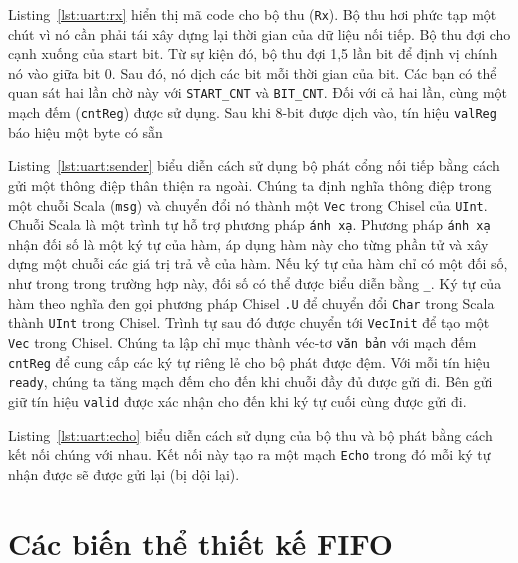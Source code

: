\documentclass[%
    10pt,
    headinclude, footexclude,
    openright, %
    notitlepage,
    cleardoubleempty,
    headsepline,
    pointlessnumbers,
    bibtotoc, idxtotoc,
    ]{scrbook}
\newcommand{\code}[1]{{\small{\texttt{#1}}}}
\begin{document}

Listing~\ref{lst:uart:rx} hiển thị mã code cho bộ thu (\code{Rx}). Bộ thu hơi phức tạp một chút vì nó cần phải tái xây dựng lại thời gian của dữ liệu nối tiếp. Bộ thu đợi cho cạnh xuống của start bit. Từ sự kiện đó, bộ thu đợi 1,5 lần bit để định vị chính nó vào giữa bit 0. Sau đó, nó dịch các bit mỗi thời gian của bit. Các bạn có thể quan sát hai lần chờ này với \code {START\_CNT} và \code{BIT\_CNT}. Đối với cả hai lần, cùng một mạch đếm (\code{cntReg}) được sử dụng. Sau khi 8-bit được dịch vào, tín hiệu \code{valReg} báo hiệu một byte có sẵn 


Listing~\ref{lst:uart:sender} biểu diễn cách sử dụng bộ phát cổng nối tiếp bằng cách gửi một thông điệp thân thiện ra ngoài. Chúng ta định nghĩa thông điệp trong một chuỗi Scala (\code{msg}) và chuyển đổi nó thành một \code{Vec} trong Chisel của \code{UInt}. Chuỗi Scala là một trình tự hỗ trợ phương pháp \code{ánh xạ}. Phương pháp \code{ánh xạ} nhận đối số là một ký tự của hàm, áp dụng hàm này cho từng phần tử và xây dựng một chuỗi các giá trị trả về của hàm. Nếu ký tự của hàm chỉ có một đối số, như trong trong trường hợp này, đối số có thể được biểu diễn bằng \code{\_}. Ký tự của hàm theo nghĩa đen gọi phương pháp Chisel \code{.U} để chuyển đổi \code{Char} trong Scala thành \code{UInt} trong Chisel. Trình tự sau đó được chuyển tới \code{VecInit} để tạo một \code{Vec} trong Chisel. Chúng ta lập chỉ mục thành véc-tơ \code{văn bản} với mạch đếm \code{cntReg} để cung cấp các ký tự riêng lẻ cho bộ phát được đệm. Với mỗi tín hiệu \code{ready}, chúng ta tăng mạch đếm cho đến khi chuỗi đầy đủ được gửi đi. Bên gửi giữ tín hiệu \code{valid} được xác nhận cho đến khi ký tự cuối cùng được gửi đi. 


Listing~\ref{lst:uart:echo} biểu diễn cách sử dụng của bộ thu và bộ phát bằng cách kết nối chúng với nhau. Kết nối này tạo ra một mạch \code{Echo} trong đó mỗi ký tự nhận được sẽ được gửi lại (bị dội lại). 

\section{Các biến thể thiết kế FIFO}
\label{sec:more:fifo}
\end{document}
